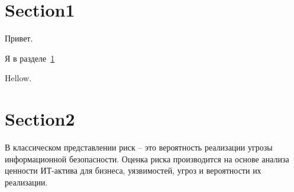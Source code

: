 \documentclass[a4paper, 12pt]{article}
\begin{document}
    \section{Section1}\label{sec:introduction}
    Привет.~\cite{managementsystem}

    Я в разделе~\ref{sec:introduction}

    Hellow.
    \section{Section2}\label{sec:introduction2}
    В классическом представлении риск – это вероятность реализации угрозы информационной безопасности.
    Оценка риска производится на основе анализа ценности ИТ-актива для бизнеса, уязвимостей, угроз и вероятности их реализации.
    
    
\end{document}
